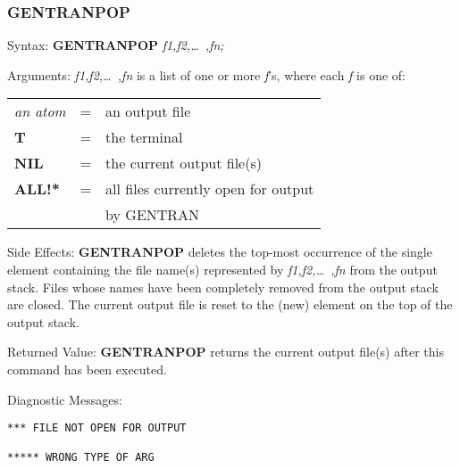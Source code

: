 \subsubsection{GENTRANPOP}
\begin{describe}{Syntax:}
{\bf GENTRANPOP} {\it f1,f2,\dots\ ,fn;}
\end{describe}
\begin{describe}{Arguments:}
{\it f1,f2,\dots\ ,fn\/} is a list of one or more {\it f\/}'s, where each 
{\it f\/} is one of:
\begin{center}
\begin{tabular}{lll}
{\it an atom} & = & an output file\\
{\bf T} & = & the terminal\\
{\bf NIL} & = & the current output file(s)\\
{\bf ALL!*} & = & all files currently open for output \\
& & by GENTRAN\\
\end{tabular}
\end{center}
\end{describe}
\begin{describe}{Side Effects:}
{\bf GENTRANPOP} deletes the top-most occurrence of the single element
containing the file name(s) represented by {\it f1,f2,\dots\ ,fn\/}
from the output stack.  Files whose names have been completely removed from
the output stack are closed.  The current output file is reset to the
(new) element on the top of the output stack.
\end{describe}
\begin{describe}{Returned Value:}
{\bf GENTRANPOP} returns the current output file(s) after this command
has been executed.
\end{describe}
\begin{describe}{Diagnostic Messages:}
\begin{verbatim}
*** FILE NOT OPEN FOR OUTPUT

***** WRONG TYPE OF ARG
\end{verbatim}
\end{describe}
